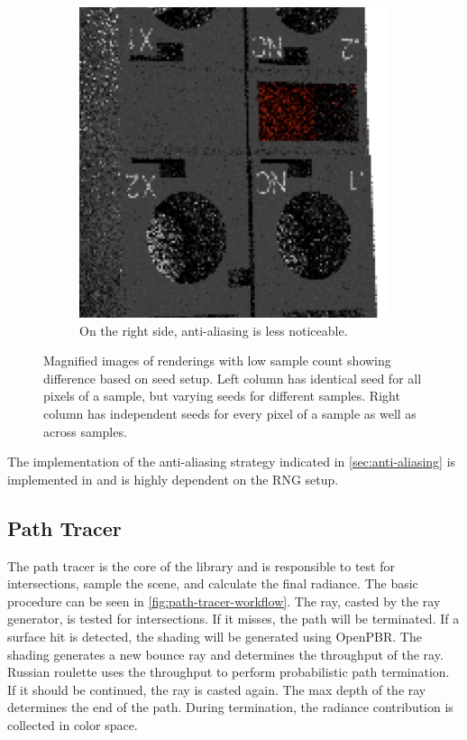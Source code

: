 \begin{figure}[H]
\begin{subfigure}[t]{0.3\textwidth}
        \includegraphics[width=\textwidth]{resources/good-seed-anti-aliasing.png}
        \caption{On the right side, anti-aliasing is less noticeable.}
        \label{fig:rngNoiseArtifactsHighlightsGoodAnti}
    \end{subfigure}
    \hspace*{2cm}
    \caption{Magnified images of renderings with low sample count showing difference based on seed setup. Left column has identical seed for all pixels of a sample, but varying seeds for different samples. Right column has independent seeds for every pixel of a sample as well as across samples.}
    \label{fig:rngNoiseArtifactsHighlights}
\end{figure}

\label{sec:anti-aliasing-implementation}
The implementation of the anti-aliasing strategy indicated in \ref{sec:anti-aliasing} is implemented in  and is highly dependent on the \gls{RNG} setup.

\subsection*{Path Tracer}

The path tracer is the core of the library and is responsible to test for intersections, sample the scene, and calculate the final radiance. The basic procedure can be seen in \autoref{fig:path-tracer-workflow}. The ray, casted by the ray generator, is tested for intersections. If it misses, the path will be terminated. If a surface hit is detected, the shading will be generated using \gls{OpenPBR}. The shading generates a new bounce ray and determines the throughput of the ray. Russian roulette uses the throughput to perform probabilistic path termination. If it should be continued, the ray is casted again. The max depth of the ray determines the end of the path. During termination, the radiance contribution is collected in  color space.

